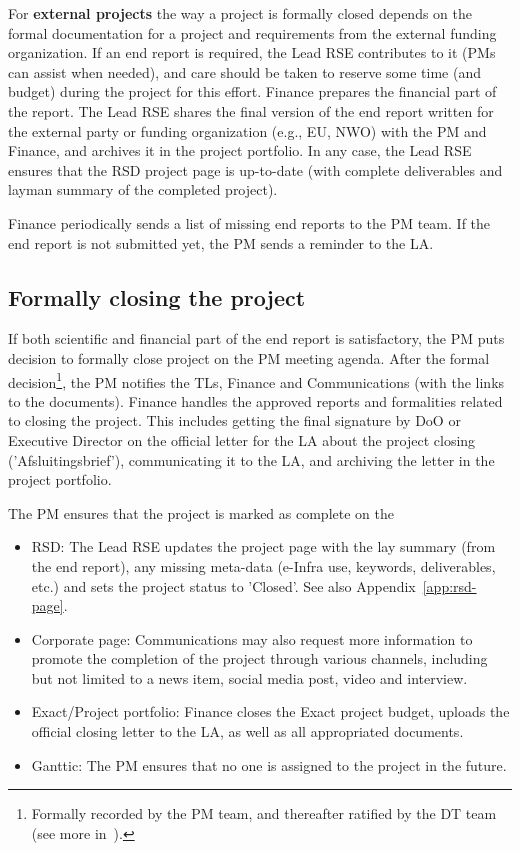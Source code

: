 For \textbf{external projects} the way a project is formally closed depends on the formal documentation for a project and requirements from the external funding organization. 
If an end report is required, the Lead RSE contributes to it (PMs can assist when needed), and care should be taken to reserve some time (and budget) during the project for this effort. 
Finance prepares the financial part of the report.   %
The Lead RSE shares the final version of the end report written for the external party or funding organization (e.g., EU, NWO) with the PM and Finance, and archives it in the project portfolio.
In any case, the Lead RSE ensures that the RSD project page is up-to-date (with complete deliverables and layman summary of the completed project).

Finance periodically sends a list of missing end reports to the PM team. If the end report is not submitted yet, the PM sends a
reminder to the LA.

\subsection{Formally closing the project}
If both scientific and financial part of the end report is satisfactory, the PM puts decision to formally close project on the PM meeting agenda. After the formal decision\footnote{Formally
recorded by the PM team, and thereafter ratified by the DT team (see more in~\cite{intranet}).}, the PM
notifies the TLs, Finance and Communications (with the links to the documents). Finance handles the approved reports and
formalities related to closing the project. This includes getting the final signature by DoO or Executive Director on
the official letter for the LA about the project closing ('Afsluitingsbrief'), communicating it to the LA, and archiving 
the letter in the project portfolio.


The PM ensures that the project is marked as complete on the 
\begin{itemize}
\item RSD: The Lead RSE updates the project page with the lay summary (from the end report), any missing meta-data (e-Infra use, keywords, deliverables, etc.) and sets the project status to 'Closed'. See also Appendix~\ref{app:rsd-page}.
\item Corporate page: Communications may also request more information to promote the completion of the project through
various channels, including but not limited to a news item, social media post, video and interview.
\item Exact/Project portfolio: Finance closes the Exact project budget, uploads the official closing letter to the LA, as well as
all appropriated documents.
\item Ganttic: The PM ensures that no one is assigned to the project in the future.
\end{itemize}
